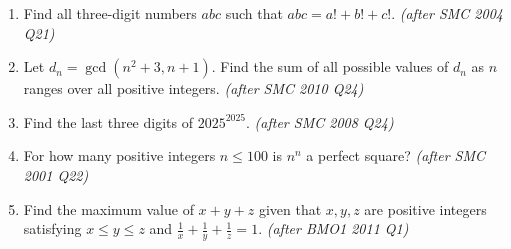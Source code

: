 \documentclass[11pt,a4paper]{article}
\begin{document}
\begin{enumerate}

\item Find all three-digit numbers $abc$ such that $abc = a! + b! + c!$. \textit{\small(after SMC 2004 Q21)}

\item Let $d_n = \gcd(n^2 + 3, n+1)$. Find the sum of all possible values of $d_n$ as $n$ ranges over all positive integers. \textit{\small(after SMC 2010 Q24)}

\item Find the last three digits of $2025^{2025}$. \textit{\small(after SMC 2008 Q24)}

\item For how many positive integers $n \le 100$ is $n^n$ a perfect square? \textit{\small(after SMC 2001 Q22)}

\item Find the maximum value of $x + y + z$ given that $x, y, z$ are positive integers satisfying $x \le y \le z$ and $\frac{1}{x} + \frac{1}{y} + \frac{1}{z} = 1$. \textit{\small(after BMO1 2011 Q1)}

\end{enumerate}

\end{document}
